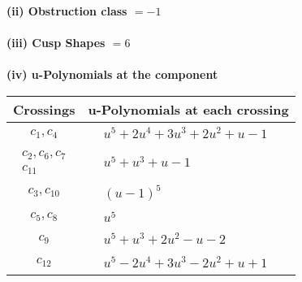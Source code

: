\documentclass[1p]{elsarticle_modified}
\theoremstyle{definition}
\begin{document}
\flushleft \textbf{(ii) Obstruction class $= -1$}\\~\\
\flushleft \textbf{(iii) Cusp Shapes $= 6$}\\~\\
\newpage\renewcommand{\arraystretch}{1}
\flushleft \textbf{(iv) u-Polynomials at the component}\newline \\
\begin{tabular}{m{50pt}|m{274pt}}
Crossings & \hspace{64pt}u-Polynomials at each crossing \\
\hline $$\begin{aligned}c_{1},c_{4}\end{aligned}$$&$\begin{aligned}
&u^5+2 u^4+3 u^3+2 u^2+u-1
\end{aligned}$\\
\hline $$\begin{aligned}c_{2},c_{6},c_{7}\\c_{11}\end{aligned}$$&$\begin{aligned}
&u^5+u^3+u-1
\end{aligned}$\\
\hline $$\begin{aligned}c_{3},c_{10}\end{aligned}$$&$\begin{aligned}
&(u-1)^5
\end{aligned}$\\
\hline $$\begin{aligned}c_{5},c_{8}\end{aligned}$$&$\begin{aligned}
&u^5
\end{aligned}$\\
\hline $$\begin{aligned}c_{9}\end{aligned}$$&$\begin{aligned}
&u^5+u^3+2 u^2- u-2
\end{aligned}$\\
\hline $$\begin{aligned}c_{12}\end{aligned}$$&$\begin{aligned}
&u^5-2 u^4+3 u^3-2 u^2+u+1
\end{aligned}$\\
\hline
\end{tabular}\\~\\
\end{document}
